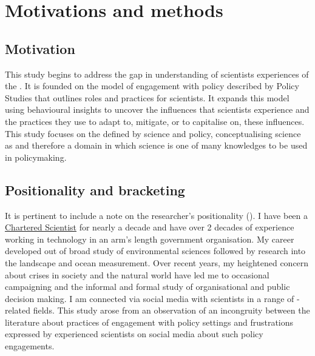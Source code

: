 \chapter{Motivations and methods}\label{ch:methods}

\section{Motivation}\label{sec:metmotivation}

This study begins to address the gap in understanding of scientists experiences of the \SPI. It is founded on the model of engagement with policy described by Policy Studies that outlines roles and practices for scientists. It expands this model using behavioural insights to uncover the influences that scientists experience and the practices they use to adapt to, mitigate, or to capitalise on, these influences. This study focuses on the \SPI{} defined by \CAN{} science and policy, conceptualising \CAN{} science as \PNS{} and therefore a domain in which science is one of many knowledges to be used in policymaking. 

\section{Positionality and bracketing}\label{sec:metpositionality}

It is pertinent  to include a note on the researcher's positionality (\cite{CreswellP2017}). I have been a \href{https://sciencecouncil.org/scientists-science-technicians/which-professional-award-is-right-for-me/csci/}{Chartered Scientist} for nearly a decade and have over 2 decades of experience working in technology in an arm's length government organisation. My career developed out of broad study of environmental sciences followed by research into the landscape and ocean measurement. Over recent years, my heightened concern about crises in society and the natural world have led me to occasional campaigning and the informal and formal study of organisational and public decision making. I am connected via social media with scientists in a range of \CAN-related fields. This study arose from an observation of an incongruity between the literature about practices of engagement with policy settings and frustrations expressed by experienced scientists on social media about such policy engagements.


